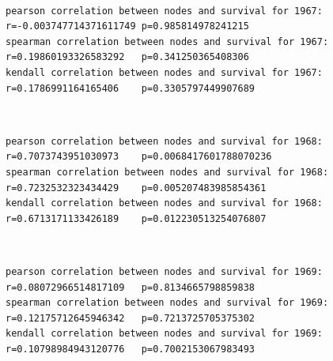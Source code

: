 \documentclass[11pt]{article}
\begin{document}
    \begin{center}
    \end{center}
    { \hspace*{\fill} \\}
    
    \begin{Verbatim}[commandchars=\\\{\}]
pearson correlation between nodes and survival for 1967:
r=-0.003747714371611749	p=0.985814978241215
spearman correlation between nodes and survival for 1967:
r=0.19860193326583292	p=0.341250365408306
kendall correlation between nodes and survival for 1967:
r=0.1786991164165406	p=0.3305797449907689

    \end{Verbatim}

    \begin{center}
    \end{center}
    { \hspace*{\fill} \\}
    
    \begin{Verbatim}[commandchars=\\\{\}]
pearson correlation between nodes and survival for 1968:
r=0.7073743951030973	p=0.0068417601788070236
spearman correlation between nodes and survival for 1968:
r=0.7232532323434429	p=0.005207483985854361
kendall correlation between nodes and survival for 1968:
r=0.6713171133426189	p=0.012230513254076807

    \end{Verbatim}

    \begin{center}
    \end{center}
    { \hspace*{\fill} \\}
    
    \begin{Verbatim}[commandchars=\\\{\}]
pearson correlation between nodes and survival for 1969:
r=0.08072966514817109	p=0.8134665798859838
spearman correlation between nodes and survival for 1969:
r=0.12175712645946342	p=0.7213725705375302
kendall correlation between nodes and survival for 1969:
r=0.10798984943120776	p=0.7002153067983493

    \end{Verbatim}
\end{document}
